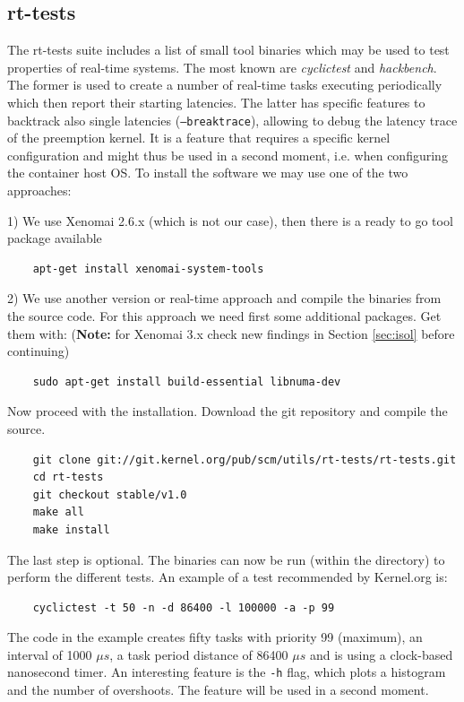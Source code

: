 \documentclass[]{scrartcl}
\begin{document}
\subsection{rt-tests}

The rt-tests suite includes a list of small tool binaries which may be used to test properties of real-time systems. The most known are \textit{cyclictest} and \textit{hackbench}.
The former is used to create a number of real-time tasks executing periodically which then report their starting latencies. 
The latter has specific features to backtrack also single latencies (\texttt{--breaktrace}), allowing to debug the latency trace of the preemption kernel. 
It is a feature that requires a specific kernel configuration and might thus be used in a second moment, i.e. when configuring the container host OS. 
To install the software we may use one of the two approaches:

1) We use Xenomai 2.6.x (which is not our case), then there is a ready to go tool package available

\begin{verbatim}
	apt-get install xenomai-system-tools
\end{verbatim}

2) We use another version or real-time approach and compile the binaries from the source code.
For this approach we need first some additional packages. Get them with: (\textbf{Note:} for Xenomai 3.x check new findings in Section \ref{sec:isol} before continuing)

\begin{verbatim}
	sudo apt-get install build-essential libnuma-dev
\end{verbatim}

Now proceed with the installation. Download the git repository and compile the source.

\begin{verbatim}
	git clone git://git.kernel.org/pub/scm/utils/rt-tests/rt-tests.git
	cd rt-tests
	git checkout stable/v1.0
	make all
	make install
\end{verbatim}

The last step is optional. The binaries can now be run (within the directory) to perform the different tests. An example of a test recommended by Kernel.org is: 

\begin{verbatim}
	cyclictest -t 50 -n -d 86400 -l 100000 -a -p 99
\end{verbatim}

The code in the example creates fifty tasks with priority 99 (maximum), an interval of 1000 $\mu s$, a task period distance of 86400 $\mu s$ and is using a clock-based nanosecond timer.
An interesting feature is the \texttt{-h} flag, which plots a histogram and the number of overshoots. The feature will be used in a second moment.
\end{document}
